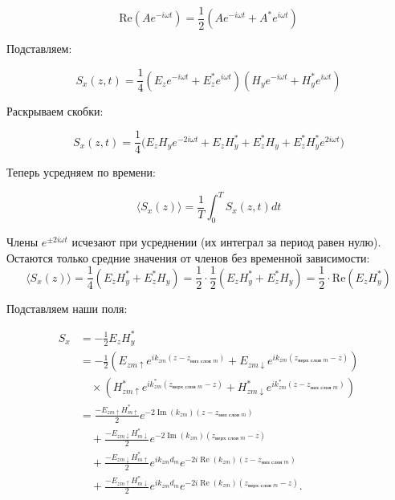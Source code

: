 \documentclass{article}
\begin{document}
$$
\text{Re}(A e^{-i\omega t}) = \frac{1}{2}(A e^{-i\omega t} + A^* e^{i\omega t})
$$

Подставляем:

$$
S_x(z,t) = \frac{1}{4} (E_z e^{-i\omega t} + E_z^* e^{i\omega t})(H_y e^{-i\omega t} + H_y^* e^{i\omega t})
$$

Раскрываем скобки:

$$
S_x(z,t) = \frac{1}{4} \Big(
E_z H_y e^{-2i\omega t} +
E_z H_y^* +
E_z^* H_y +
E_z^* H_y^* e^{2i\omega t}
\Big)
$$

Теперь усредняем по времени:

$$
\langle S_x(z) \rangle = \frac{1}{T} \int_0^T S_x(z,t) dt
$$

Члены $ e^{\pm 2i\omega t} $ исчезают при усреднении (их интеграл за период равен нулю). Остаются только средние значения от членов без временной зависимости:
$$
\langle S_x(z) \rangle = \frac{1}{4} (E_z H_y^* + E_z^* H_y)
= \frac{1}{2} \cdot \frac{1}{2} (E_z H_y^* + E_z^* H_y)
= \frac{1}{2} \cdot \text{Re}(E_z H_y^*)
$$

Подставляем наши поля:

\begin{equation}
\begin{aligned}
S_x &= -\frac{1}{2} E_z H_y^* \\
&= -\frac{1}{2} \left( E_{zm\uparrow} e^{i k_{zm}(z - z_{\text{низ слоя } m})} + E_{zm\downarrow} e^{i k_{zm}(z_{\text{верх слоя } m} - z)} \right) \\
&\quad \times \left( H^*_{zm\uparrow} e^{i k^*_{zm}(z_{\text{верх слоя } m} - z)} + H^*_{zm\downarrow} e^{i k^*_{zm}(z - z_{\text{низ слоя } m})} \right) \\
&= \frac{-E_{zm\uparrow}H_{m\uparrow}^*}{2} e^{-2 \operatorname{Im}(k_{zm})(z-z_{\text{низ слоя } m})} \\
&\quad + \frac{-E_{zm\downarrow}H_{m\downarrow}^*}{2} e^{-2 \operatorname{Im}(k_{zm})(z_{\text{верх слоя } m}-z)} \\
&\quad + \frac{-E_{zm\downarrow}H_{m\uparrow}^*}{2} e^{ik_{zm} d_m} e^{-2i \operatorname{Re}(k_{zm})(z-z_{\text{низ слоя } m})} \\
&\quad + \frac{-E_{zm\uparrow}H_{m\downarrow}^*}{2} e^{ik_{zm} d_m} e^{-2i \operatorname{Re}(k_{zm})(z_{\text{верх слоя } m}-z)}.
\end{aligned}
\end{equation}
\end{document}
